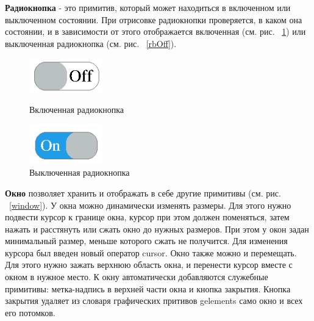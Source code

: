\documentclass[14pt]{extarticle}
\begin{document}
		
		\textbf{Радиокнопка} - это примитив, который может находиться в включенном или выключенном состоянии. При отрисовке радиокнопки проверяется, в каком она состоянии, и в зависимости от этого отображается включенная (см. рис. ~\ref{rbOn}) или выключенная радиокнопка (см. рис. ~\ref{rbOff}).
		\begin{figure}[h]
		\begin{center}
		\begin{minipage}[h]{0.4\linewidth}
		\includegraphics[width=90pt]{pictures/toggleButton1.png}
		\caption{ Включенная радиокнопка} %
		\label{rbOff} %
		\end{minipage}
		\hfill 
		\begin{minipage}[h]{0.4\linewidth}
		\includegraphics[width=90pt]{pictures/toggleButton2.png}
		\caption{Выключенная радиокнопка}
		\label{rbOn}
		\end{minipage}
		\end{center}
		\end{figure}
		
		\pagebreak
	\textbf{Окно} позволяет хранить и отображать в себе другие примитивы (см. рис. ~\ref{window}). У окна можно динамически изменять размеры. Для этого нужно подвести курсор к границе окна, курсор при этом должен поменяться, затем нажать и расстянуть или сжать окно до нужных размеров. При этом у окон задан минимальный размер, меньше которого сжать не получится. Для изменения курсора был введен новый оператор cursor. Окно также можно и перемещать. Для этого нужно зажать верхнюю область окна, и перенести курсор вместе с окном в нужное место. К окну автоматически добавляются служебные примитивы: метка-надпись в верхней части окна и кнопка закрытия. Кнопка закрытия удаляет из словаря графических притивов gelements само окно и всех его потомков.
			
\end{document}
